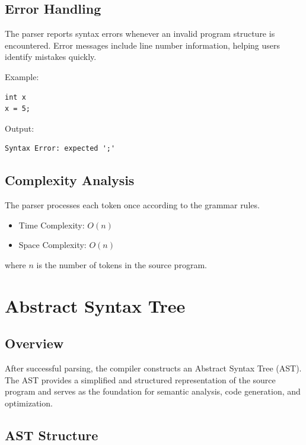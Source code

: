 \documentclass[12pt,a4paper]{report}
\begin{document}
\section{Error Handling}

The parser reports syntax errors whenever an invalid program structure is encountered. Error messages include line number information, helping users identify mistakes quickly.

Example:

\begin{lstlisting}
int x
x = 5;
\end{lstlisting}

Output:

\begin{lstlisting}
Syntax Error: expected ';'
\end{lstlisting}

\section{Complexity Analysis}

The parser processes each token once according to the grammar rules.

\begin{itemize}
    \item Time Complexity: \(O(n)\)
    \item Space Complexity: \(O(n)\)
\end{itemize}

where \(n\) is the number of tokens in the source program.


\chapter{Abstract Syntax Tree}

\section{Overview}

After successful parsing, the compiler constructs an Abstract Syntax Tree (AST). The AST provides a simplified and structured representation of the source program and serves as the foundation for semantic analysis, code generation, and optimization.

\section{AST Structure}
\end{document}
